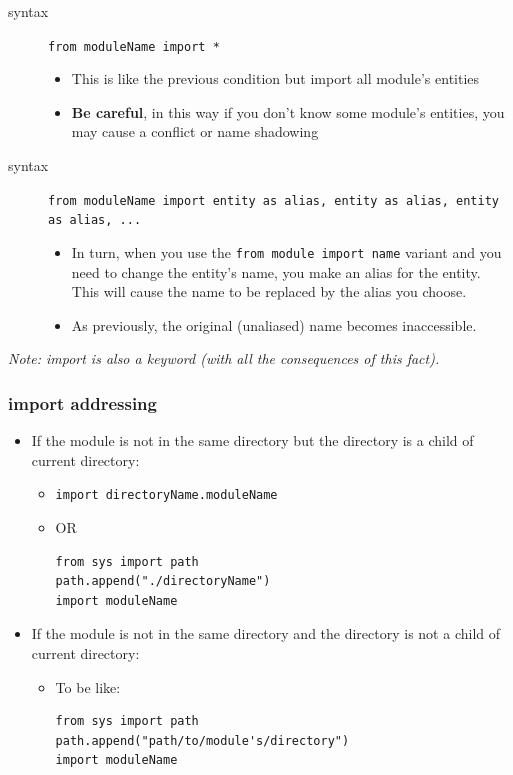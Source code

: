 \documentclass[11pt]{article}
\begin{document}
\begin{description}
\item[{syntax}] \texttt{from moduleName import *}
\begin{itemize}
\item This is like the previous condition but import all module's entities
\item \textbf{Be careful}, in this way if you don't know some module's
entities, you may cause a conflict or name shadowing
\end{itemize}

\item[{syntax}] \texttt{from moduleName import entity as alias, entity as alias, entity as alias, ...}
\begin{itemize}
\item In turn, when you use the \texttt{from module import name} variant and you
need to change the entity’s name, you make an alias for the
entity. This will cause the name to be replaced by the alias you
choose.
\item As previously, the original (unaliased) name becomes inaccessible.
\end{itemize}
\end{description}


\emph{Note: import is also a keyword (with all the
consequences of this fact).}

\subsubsection{import addressing}
\label{sec:org4d22c45}
\begin{itemize}
\item If the module is not in the same directory but the directory is a
child of current directory:
\begin{itemize}
\item \texttt{import directoryName.moduleName}
\item OR 
\begin{verbatim}
from sys import path
path.append("./directoryName")
import moduleName
\end{verbatim}
\end{itemize}
\item If the module is not in the same directory and the directory is not
a child of current directory:
\begin{itemize}
\item To be like:
\begin{verbatim}
from sys import path
path.append("path/to/module's/directory")
import moduleName
\end{verbatim}
\end{itemize}
\end{itemize}
\end{document}
